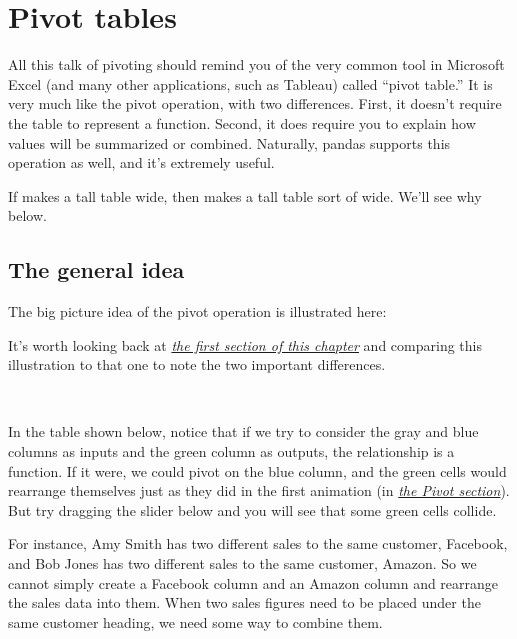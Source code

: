 \documentclass[letterpaper,10pt,english]{jupyterBook}
\begin{document}
\section{Pivot tables}
\label{\detokenize{chapter-6-single-table-verbs:pivot-tables}}
\sphinxAtStartPar
All this talk of pivoting should remind you of the very common tool in Microsoft Excel (and many other applications, such as Tableau) called “pivot table.”  It is very much like the pivot operation, with two differences.  First, it doesn’t require the table to represent a function.  Second, it does require you to explain how values will be summarized or combined.  Naturally, pandas supports this operation as well, and it’s extremely useful.

\sphinxAtStartPar
If  makes a tall table wide, then  makes a tall table sort of wide.  We’ll see why below.


\subsection{The general idea}
\label{\detokenize{chapter-6-single-table-verbs:id2}}
\sphinxAtStartPar
The big picture idea of the pivot operation is illustrated here:

\sphinxAtStartPar
{}

\sphinxAtStartPar
It’s worth looking back at {\hyperref[\detokenize{chapter-6-single-table-verbs:pivot}]{\emph{the first section of this chapter}}} and comparing this illustration to that one to note the two important differences.

\sphinxAtStartPar
 

\sphinxAtStartPar
In the table shown below, notice that if we try to consider the gray and blue columns as inputs and the green column as outputs, the relationship is  a function.  If it were, we could pivot on the blue column, and the green cells would rearrange themselves just as they did in the first animation (in {\hyperref[\detokenize{chapter-6-single-table-verbs:pivot}]{\emph{the Pivot section}}}).  But try dragging the slider below  and you will see that some green cells collide.

\sphinxAtStartPar
For instance, Amy Smith has two different sales to the same customer, Facebook, and Bob Jones has two different sales to the same customer, Amazon.  So we cannot simply create a Facebook column and an Amazon column and rearrange the sales data into them.  When two sales figures need to be placed under the same customer heading, we need some way to combine them.
\end{document}
